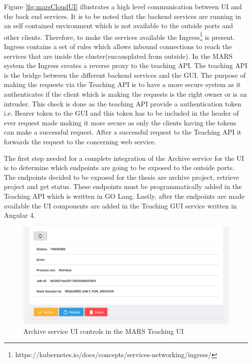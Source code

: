 Figure \ref{fig:marsCloudUI} illustrates a high level communication between UI and the back end services. It is to be noted that the backend services
are running in an self contained environment which is not available to the outside ports and other clients. Therefore, 
to make the services available the Ingress\footnote{https://kubernetes.io/docs/concepts/services-networking/ingress/} is present. Ingress contains
a set of rules which allows inbound connections to reach the services that are inside the cluster(encausplated from outside). In the MARS system
the Ingress creates a reverse proxy to the teaching API. The teaching API is the bridge between the different backend services and the GUI. The purpose
of making the requests via the Teaching API is to have a more secure system as it authenticates if the client which is making the requests is the right owner or 
is an intruder. This check is done as the teaching API provide a authentication token i.e. Bearer token to the GUI and this token has to be included in the
header of ever request made making it more secure as only the clients having the tokens can make a successful request. After a successful request to the Teaching API
it forwards the request to the concerning web service.


The first step needed for a complete integration of the Archive service for the UI is to determine which endpoints are going to be exposed to the outside ports.
The endpoints decided to be exposed for the thesis are archive project, retrieve project and get status. These endpoints must be programmatically added
in the Teaching API which is written in GO Lang. Lastly, after the endpoints are made available the UI components are added in the Teaching GUI service
written in Angular 4. 

\begin{figure}[H]
    \centering \includegraphics[scale=0.5]{grafiken/archiveUI.png}
    \caption{Archive service UI controls in the MARS Teaching UI}
    \label{fig:archiveUI}
\end{figure}

